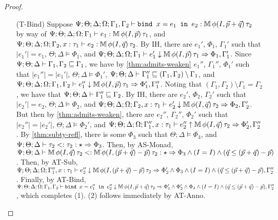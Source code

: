 \begin{proof}
\begin{itemize}
  \item[(T-Bind)] 
  Suppose $\Psi ; \Theta ; \Delta ; \Omega ; \Gamma_1,\Gamma_2 \vdash \texttt{bind } x = e_1 \texttt{ in } e_2 : \mathbb{M} \, \phi(I,\vec{p} + \vec{q})\, \tau_2$ by way of
  $\Psi ; \Theta ; \Delta ; \Omega ; \Gamma_1 \vdash e_1 : \mathbb{M} \, \phi(I,\vec{p})\, \tau_1$, and
  $\Psi ; \Theta; \Delta ; \Omega ; \Gamma_2, x:\tau_1 \vdash e_2 : \mathbb{M} \, \phi(I,\vec{q})\, \tau_2$.
  By IH, there are $e_1'$, $\Phi_1$, $\Gamma_1'$ such that
  $|e_1'| = e_1$,
  $\Theta ; \Delta \vDash \Phi_1$, and
  $\Psi  ; \Theta ; \Delta ; \Omega ; \Gamma_1 \vdash e_1' \downarrow \mathbb{M} \, \phi(I,\vec{p}) \, \tau_1 \Rightarrow \Phi_1,\Gamma_1'$.
  Since $\Psi ; \Theta ; \Delta \vdash \Gamma_1,\Gamma_2 \sqsubseteq \Gamma_1$,
  we have by \autoref{thm:admits-weaken} $e_1''$, $\Gamma_1''$, $\Phi_1'$ such that
  $|e_1''| = |e_1'|$,
  $\Theta ; \Delta \vDash \Phi_1'$,
  $\Psi ; \Theta ; \Delta \vdash \Gamma_1'' \sqsubseteq (\Gamma_1,\Gamma_2) \setminus \Gamma_1$, and
  $\Psi ; \Theta ; \Delta ; \Omega ; \Gamma_1,\Gamma_2 \vdash e_1'' \downarrow \mathbb{M} \, \phi(I,\vec{p}) \, \tau_1 \Rightarrow \Phi_1',\Gamma_1''$.
  Noting that $(\Gamma_1,\Gamma_2) \setminus \Gamma_1 = \Gamma_2$, we have that
  $\Psi ; \Theta ; \Delta \vdash \Gamma_1'' \sqsubseteq \Gamma_2$.
  By IH, there are $e_2'$, $\Phi_2$, $\Gamma_2'$ such that
  $|e_2'| = e_2$,
  $\Theta ; \Delta \vDash \Phi_2$, and
  $\Psi ; \Theta; \Delta ; \Omega ; \Gamma_2, x:\tau_1 \vdash e_2' \downarrow \mathbb{M} \, \phi(I,\vec{q})\, \tau_2 \Rightarrow \Phi_2,\Gamma_2'$.
  But then by \autoref{thm:admits-weaken}, there are $e_2''$, $\Gamma_2''$, $\Phi_2'$ such that
  $|e_2''| = |e_2'|$,
  $\Theta ; \Delta \vDash \Phi_2'$, and
  $\Psi ; \Theta ; \Delta ; \Omega ; \Gamma_1'', x : \tau_1 \vdash e_2'' \uparrow \mathbb{M} \, \phi(I,\vec{q}) \, \tau_2 \Rightarrow \Phi_2',\Gamma_2''$.
  By \autoref{thm:subty-refl}, there is some $\Phi_3$ such that $\Theta ; \Delta \vDash \Phi_3$, and
  $\Psi ; \Theta ; \Delta \vdash \tau_2 <: \tau_2 : \star \Rightarrow \Phi_3$.
  Then, by AS-Monad, $\Psi ; \Theta ; \Delta \vdash \mathbb{M} \, \phi(I,\vec{q}) \, \tau_2 <: \mathbb{M} \, \phi(I,(\vec{p} + \vec{q}) - \vec{p}) \, \tau_2 : \star \Rightarrow \Phi_3 \wedge (I = I) \wedge (\vec{q} \leq (\vec{p} + \vec{q}) - \vec{p})$.
  Then, by AT-Sub,
  $\Psi ; \Theta ; \Delta ; \Omega ; \Gamma_1'', x : \tau_1 \vdash e_2'' \downarrow \mathbb{M} \, \phi(I,(\vec{p} + \vec{q}) - \vec{p}) \, \tau_2 \Rightarrow \Phi_2' \wedge  \Phi_3 \wedge (I = I) \wedge (\vec{q} \leq (\vec{p} + \vec{q}) - \vec{p}),\Gamma_2''$.
  Finally, by AT-Bind,
  $\Psi ; \Theta ; \Delta ; \Omega ; \Gamma_1,\Gamma_2 \vdash \texttt{bind } x = e_1'' \texttt{ in } e_2'' \downarrow \mathbb{M} \, \phi(I,\vec{p} + \vec{q})\, \tau_2 \Rightarrow \Phi_1' \wedge \Phi_2' \wedge \Phi_3 \wedge (I = I) \wedge (\vec{q} \leq (\vec{p} + \vec{q}) - \vec{p}), \Gamma_2''$, which completes (1). (2) follows immediately by AT-Anno.
  

\end{itemize}
\end{proof}
